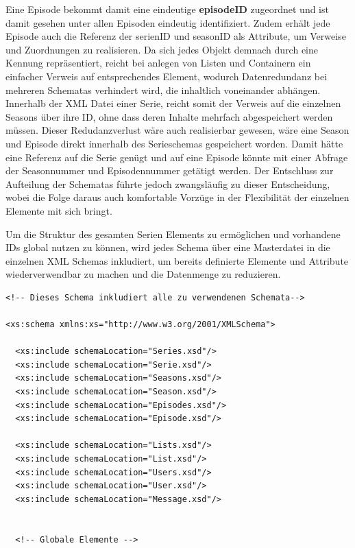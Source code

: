 Eine Episode bekommt damit eine eindeutige \textbf{episodeID} zugeordnet und ist damit gesehen unter allen Episoden eindeutig identifiziert. Zudem erhält jede Episode auch die Referenz der serienID und seasonID als Attribute, um Verweise und Zuordnungen zu realisieren. Da sich jedes Objekt demnach durch eine Kennung repräsentiert, reicht bei anlegen von Listen und Containern ein einfacher Verweis auf entsprechendes Element, wodurch Datenredundanz bei mehreren Schematas verhindert wird, die inhaltlich voneinander abhängen. Innerhalb der XML Datei einer Serie, reicht somit der Verweis auf die einzelnen Seasons über ihre ID, ohne dass deren Inhalte mehrfach abgespeichert werden müssen.
Dieser Redudanzverlust wäre auch realisierbar gewesen, wäre eine Season und Episode direkt innerhalb des Serieschemas gespeichert worden. Damit hätte eine Referenz auf die Serie genügt und auf eine Episode könnte mit einer Abfrage der Seasonnummer und Episodennummer getätigt werden. Der Entschluss zur Aufteilung der Schematas führte jedoch zwangsläufig zu dieser Entscheidung, wobei die Folge daraus auch komfortable Vorzüge in der Flexibilität der einzelnen Elemente mit sich bringt.


\parskip 12pt
\parindent 0pt
Um die Struktur des gesamten Serien Elements zu ermöglichen und vorhandene IDs global nutzen zu können, wird jedes Schema über eine Masterdatei in die einzelnen XML Schemas inkludiert, um bereits definierte Elemente und Attribute wiederverwendbar zu machen und die Datenmenge zu reduzieren.

\begin{lstlisting}[label=xsd-definition,caption= Auszug aus der Masterinklude Serientracker.xsd]
<!-- Dieses Schema inkludiert alle zu verwendenen Schemata-->

<xs:schema xmlns:xs="http://www.w3.org/2001/XMLSchema">

  <xs:include schemaLocation="Series.xsd"/>
  <xs:include schemaLocation="Serie.xsd"/>
  <xs:include schemaLocation="Seasons.xsd"/>
  <xs:include schemaLocation="Season.xsd"/>
  <xs:include schemaLocation="Episodes.xsd"/>
  <xs:include schemaLocation="Episode.xsd"/>

  <xs:include schemaLocation="Lists.xsd"/>
  <xs:include schemaLocation="List.xsd"/>
  <xs:include schemaLocation="Users.xsd"/>
  <xs:include schemaLocation="User.xsd"/>
  <xs:include schemaLocation="Message.xsd"/>


  <!-- Globale Elemente -->
\end{lstlisting}

